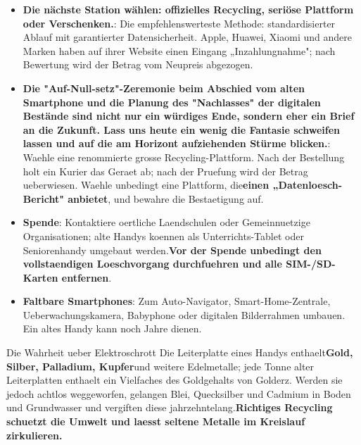 \begin{itemize}
  \item \textbf{Die nächste Station wählen: offizielles Recycling, seriöse Plattform oder Verschenken.}: Die empfehlenswerteste Methode: standardisierter Ablauf mit garantierter Datensicherheit. Apple, Huawei, Xiaomi und andere Marken haben auf ihrer Website einen Eingang „Inzahlungnahme"; nach Bewertung wird der Betrag vom Neupreis abgezogen.
  \item \textbf{Die "Auf-Null-setz"-Zeremonie beim Abschied vom alten Smartphone und die Planung des "Nachlasses" der digitalen Bestände sind nicht nur ein würdiges Ende, sondern eher ein Brief an die Zukunft. Lass uns heute ein wenig die Fantasie schweifen lassen und auf die am Horizont aufziehenden Stürme blicken.}: Waehle eine renommierte grosse Recycling-Plattform. Nach der Bestellung holt ein Kurier das Geraet ab; nach der Pruefung wird der Betrag ueberwiesen. Waehle unbedingt eine Plattform, die\textbf{einen „Datenloesch-Bericht" anbietet}, und bewahre die Bestaetigung auf.
  \item \textbf{Spende}: Kontaktiere oertliche Laendschulen oder Gemeinnuetzige Organisationen; alte Handys koennen als Unterrichts-Tablet oder Seniorenhandy umgebaut werden.\textbf{Vor der Spende unbedingt den vollstaendigen Loeschvorgang durchfuehren und alle SIM-/SD-Karten entfernen}.
  \item \textbf{Faltbare Smartphones}: Zum Auto-Navigator, Smart-Home-Zentrale, Ueberwachungskamera, Babyphone oder digitalen Bilderrahmen umbauen. Ein altes Handy kann noch Jahre dienen.
\end{itemize}

\begin{tcbinfo}{Die Wahrheit ueber Elektroschrott}
Die Leiterplatte eines Handys enthaelt\textbf{Gold, Silber, Palladium, Kupfer}und weitere Edelmetalle; jede Tonne alter Leiterplatten enthaelt ein Vielfaches des Goldgehalts von Golderz. Werden sie jedoch achtlos weggeworfen, gelangen Blei, Quecksilber und Cadmium in Boden und Grundwasser und vergiften diese jahrzehntelang.\textbf{Richtiges Recycling schuetzt die Umwelt und laesst seltene Metalle im Kreislauf zirkulieren.}

\end{tcbinfo}

